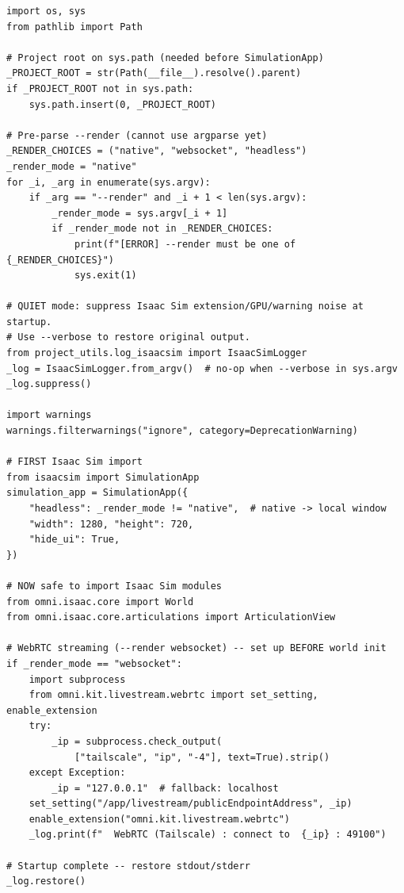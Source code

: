 \documentclass[11pt,a4paper]{article}
\begin{document}
\begin{lstlisting}[caption={Mandatory import sequence --- \texttt{script\_cup\_manipulator\_pendulam\_tendon\_computed\_torque\_isaac\_sim.py}}]
import os, sys
from pathlib import Path

# Project root on sys.path (needed before SimulationApp)
_PROJECT_ROOT = str(Path(__file__).resolve().parent)
if _PROJECT_ROOT not in sys.path:
    sys.path.insert(0, _PROJECT_ROOT)

# Pre-parse --render (cannot use argparse yet)
_RENDER_CHOICES = ("native", "websocket", "headless")
_render_mode = "native"
for _i, _arg in enumerate(sys.argv):
    if _arg == "--render" and _i + 1 < len(sys.argv):
        _render_mode = sys.argv[_i + 1]
        if _render_mode not in _RENDER_CHOICES:
            print(f"[ERROR] --render must be one of {_RENDER_CHOICES}")
            sys.exit(1)

# QUIET mode: suppress Isaac Sim extension/GPU/warning noise at startup.
# Use --verbose to restore original output.
from project_utils.log_isaacsim import IsaacSimLogger
_log = IsaacSimLogger.from_argv()  # no-op when --verbose in sys.argv
_log.suppress()

import warnings
warnings.filterwarnings("ignore", category=DeprecationWarning)

# FIRST Isaac Sim import
from isaacsim import SimulationApp
simulation_app = SimulationApp({
    "headless": _render_mode != "native",  # native -> local window
    "width": 1280, "height": 720,
    "hide_ui": True,
})

# NOW safe to import Isaac Sim modules
from omni.isaac.core import World
from omni.isaac.core.articulations import ArticulationView

# WebRTC streaming (--render websocket) -- set up BEFORE world init
if _render_mode == "websocket":
    import subprocess
    from omni.kit.livestream.webrtc import set_setting, enable_extension
    try:
        _ip = subprocess.check_output(
            ["tailscale", "ip", "-4"], text=True).strip()
    except Exception:
        _ip = "127.0.0.1"  # fallback: localhost
    set_setting("/app/livestream/publicEndpointAddress", _ip)
    enable_extension("omni.kit.livestream.webrtc")
    _log.print(f"  WebRTC (Tailscale) : connect to  {_ip} : 49100")

# Startup complete -- restore stdout/stderr
_log.restore()
\end{lstlisting}
\end{document}

